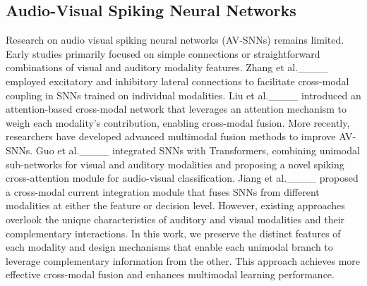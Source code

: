 \subsection{Audio-Visual Spiking Neural Networks}
Research on audio visual spiking neural networks (AV-SNNs) remains limited. Early studies primarily focused on simple connections or straightforward combinations of visual and auditory modality features. Zhang et al.____ employed excitatory and inhibitory lateral connections to facilitate cross-modal coupling in SNNs trained on individual modalities. Liu et al.____ introduced an attention-based cross-modal network that leverages an attention mechanism to weigh each modality's contribution, enabling cross-modal fusion.
More recently, researchers have developed advanced multimodal fusion methods to improve AV-SNNs. Guo et al.____ integrated SNNs with Transformers, combining unimodal sub-networks for visual and auditory modalities and proposing a novel spiking cross-attention module for audio-visual classification. Jiang et al.____ proposed a cross-modal current integration module that fuses SNNs from different modalities at either the feature or decision level.
However, existing approaches overlook the unique characteristics of auditory and visual modalities and their complementary interactions. In this work, we preserve the distinct features of each modality and design mechanisms that enable each unimodal branch to leverage complementary information from the other. This approach achieves more effective cross-modal fusion and enhances multimodal learning performance.